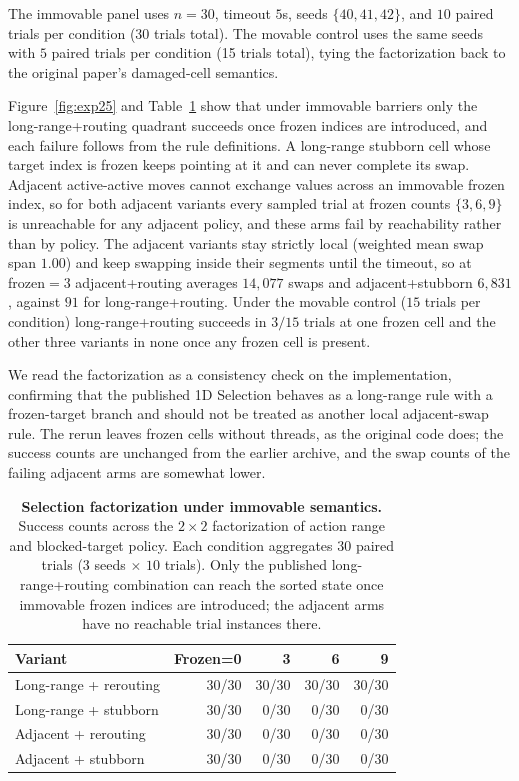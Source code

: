 \documentclass[11pt]{article}
\begin{document}
The immovable panel uses $n=30$, timeout $5$s, seeds $\{40,41,42\}$, and $10$ paired trials per
condition (30 trials total). The movable control uses the same seeds with $5$ paired trials per
condition (15 trials total), tying the factorization back to the original paper's damaged-cell
semantics.

Figure~\ref{fig:exp25} and Table~\ref{tab:exp25} show that under immovable barriers only the
long-range+routing quadrant succeeds once frozen indices are introduced, and each failure follows
from the rule definitions. A long-range stubborn cell whose target index is frozen keeps pointing
at it and can never complete its swap. Adjacent active-active moves cannot exchange values across
an immovable frozen index, so for both adjacent variants every sampled trial at frozen counts
$\{3,6,9\}$ is unreachable for any adjacent policy, and these arms fail by reachability rather than
by policy. The adjacent variants stay strictly local (weighted mean swap span $1.00$) and keep
swapping inside their segments until the timeout, so at frozen$=3$ adjacent+routing averages
$14{,}077$ swaps and adjacent+stubborn $6{,}831$, against $91$ for long-range+routing. Under the
movable control ($15$ trials per condition) long-range+routing succeeds in $3/15$ trials at one
frozen cell and the other three variants in none once any frozen cell is present.

We read the factorization as a consistency check on the implementation, confirming that the
published 1D Selection behaves as a long-range rule with a frozen-target branch and should not be
treated as another local adjacent-swap rule. The rerun leaves frozen cells without threads, as the
original code does; the success counts are unchanged from the earlier archive, and the swap counts
of the failing adjacent arms are somewhat lower.

\begin{table}[t]
  \centering
  \small
  \begin{tabular}{@{}lrrrr@{}}
    \toprule
    Variant & Frozen=0 & 3 & 6 & 9 \\
    \midrule
    Long-range + rerouting & 30/30 & 30/30 & 30/30 & 30/30 \\
    Long-range + stubborn & 30/30 & 0/30 & 0/30 & 0/30 \\
    Adjacent + rerouting & 30/30 & 0/30 & 0/30 & 0/30 \\
    Adjacent + stubborn & 30/30 & 0/30 & 0/30 & 0/30 \\
    \bottomrule
  \end{tabular}
  \caption{\textbf{Selection factorization under immovable semantics.}
  Success counts across the $2\times2$ factorization of action range and blocked-target policy.
  Each condition aggregates $30$ paired trials ($3$ seeds $\times$ $10$ trials). Only the
  published long-range+routing combination can reach the sorted state once immovable frozen
  indices are introduced; the adjacent arms have no reachable trial instances there.}
  \label{tab:exp25}
\end{table}
\end{document}
